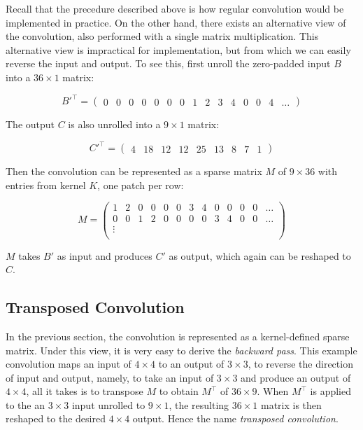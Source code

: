Recall that the precedure described above is how regular convolution would be implemented in practice.
On the other hand, there exists an alternative view of the convolution, also performed with a single
matrix multiplication. This alternative view is impractical for implementation, but from which
we can easily reverse the input and output. To see this, first unroll the zero-padded input $B$ into
a $36 \times 1$ matrix:

\setcounter{MaxMatrixCols}{20}

$$
B'^\intercal =
  \begin{pmatrix}
    0 & 0 & 0 & 0 & 0 & 0 & 0 & 1 & 2 & 3 & 4 & 0 & 0 & 4 & \dots
  \end{pmatrix}
$$

The output $C$ is also unrolled into a $9 \times 1$ matrix:

$$
C'^\intercal =
  \begin{pmatrix}
    4 & 18 & 12 & 12 & 25 & 13 & 8 & 7 & 1
  \end{pmatrix}
$$

Then the convolution can be represented as a sparse matrix $M$ of $9 \times 36$ with entries from kernel $K$,
one patch per row:

$$
M =
  \begin{pmatrix}
    1 & 2 & 0 & 0 & 0 & 0 & 3 & 4 & 0 & 0 & 0 & 0 & \dots \\
    0 & 0 & 1 & 2 & 0 & 0 & 0 & 0 & 3 & 4 & 0 & 0 & \dots \\
    \vdots \\
  \end{pmatrix}
$$

$M$ takes $B'$ as input and produces $C'$ as output, which again can be reshaped to $C$.

\subsection{Transposed Convolution}
In the previous section, the convolution is represented as a kernel-defined sparse matrix. Under this view,
it is very easy to derive the \textit{backward pass}. This example convolution maps an input of $4 \times 4$
to an output of $3 \times 3$, to reverse the direction of input and output, namely, to take an input of
$3 \times 3$ and produce an output of $4 \times 4$, all it takes is to transpose $M$ to obtain $M^\intercal$
of $36 \times 9$. When $M^\intercal$ is applied to the an $3 \times 3$ input unrolled to $9 \times 1$, the
resulting $36 \times 1$ matrix is then reshaped to the desired $4 \times 4$ output. Hence the name
\textit{transposed convolution}.

